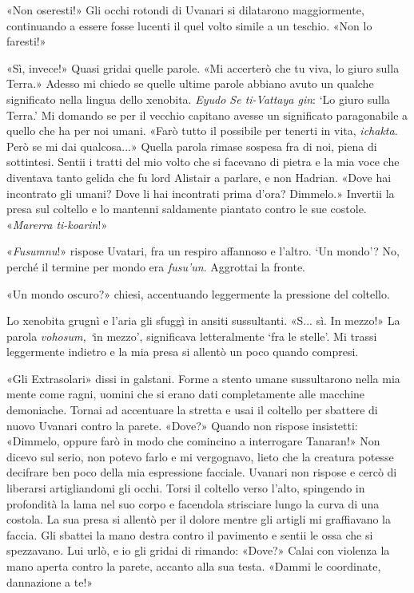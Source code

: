 «Non oseresti!» Gli occhi rotondi di Uvanari si dilatarono maggiormente,
continuando a essere fosse lucenti il quel volto simile a un teschio.
«Non lo faresti!»

«Sì, invece!» Quasi gridai quelle parole. «Mi accerterò che tu viva, lo
giuro sulla Terra.» Adesso mi chiedo se quelle ultime parole abbiano
avuto un qualche significato nella lingua dello xenobita. \emph{Eyudo Se
	ti-Vattaya gin}: `Lo giuro sulla Terra.' Mi domando se per il vecchio
capitano avesse un significato paragonabile a quello che ha per noi
umani. «Farò tutto il possibile per tenerti in vita, \emph{ichakta}.
Però se mi dai qualcosa...» Quella parola rimase sospesa fra di noi,
piena di sottintesi. Sentii i tratti del mio volto che si facevano di
pietra e la mia voce che diventava tanto gelida che fu lord Alistair a
parlare, e non Hadrian. «Dove hai incontrato gli umani? Dove li hai
incontrati prima d'ora? Dimmelo.» Invertii la presa sul coltello e lo
mantenni saldamente piantato contro le sue costole. «\emph{Marerra
	ti-koarin}!»

«\emph{Fusumnu}!» rispose Uvatari, fra un respiro affannoso e l'altro.
`Un mondo'? No, perché il termine per mondo era \emph{fusu'un}.
Aggrottai la fronte.

«Un mondo oscuro?» chiesi, accentuando leggermente la pressione del
coltello.

Lo xenobita grugnì e l'aria gli sfuggì in ansiti sussultanti. «S... sì.
In mezzo!» La parola \emph{vohosum, `}in mezzo', significava
letteralmente `fra le stelle'. Mi trassi leggermente indietro e la mia
presa si allentò un poco quando compresi.

«Gli Extrasolari» dissi in galstani. Forme a stento umane sussultarono
nella mia mente come ragni, uomini che si erano dati completamente alle
macchine demoniache. Tornai ad accentuare la stretta e usai il coltello
per sbattere di nuovo Uvanari contro la parete. «Dove?» Quando non
rispose insistetti: «Dimmelo, oppure farò in modo che comincino a
interrogare Tanaran!» Non dicevo sul serio, non potevo farlo e mi
vergognavo, lieto che la creatura potesse decifrare ben poco della mia
espressione facciale. Uvanari non rispose e cercò di liberarsi
artigliandomi gli occhi. Torsi il coltello verso l'alto, spingendo in
profondità la lama nel suo corpo e facendola strisciare lungo la curva
di una costola. La sua presa si allentò per il dolore mentre gli artigli
mi graffiavano la faccia. Gli sbattei la mano destra contro il pavimento
e sentii le ossa che si spezzavano. Lui urlò, e io gli gridai di
rimando: «Dove?» Calai con violenza la mano aperta contro la parete,
accanto alla sua testa. «Dammi le coordinate, dannazione a te!»

